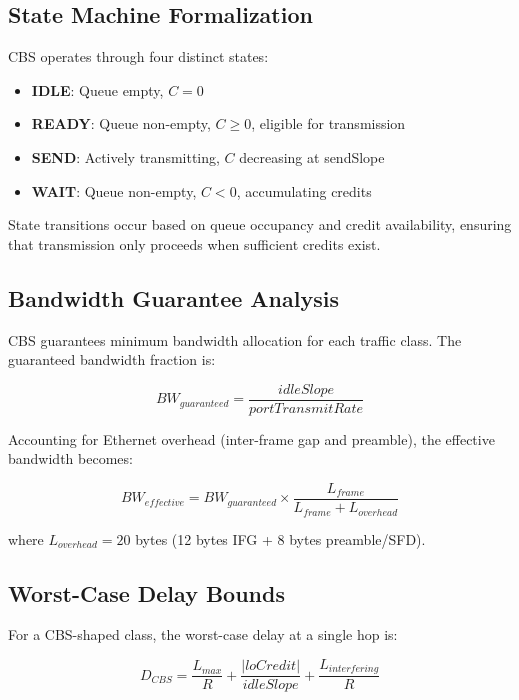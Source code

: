 \documentclass[10pt, journal, compsoc]{IEEEtran}
\begin{document}
\subsection{State Machine Formalization}

CBS operates through four distinct states:

\begin{itemize}
    \item \textbf{IDLE}: Queue empty, $C = 0$
    \item \textbf{READY}: Queue non-empty, $C \geq 0$, eligible for transmission
    \item \textbf{SEND}: Actively transmitting, $C$ decreasing at sendSlope
    \item \textbf{WAIT}: Queue non-empty, $C < 0$, accumulating credits
\end{itemize}

State transitions occur based on queue occupancy and credit availability, ensuring that transmission only proceeds when sufficient credits exist.

\subsection{Bandwidth Guarantee Analysis}

CBS guarantees minimum bandwidth allocation for each traffic class. The guaranteed bandwidth fraction is:

\begin{equation}
BW_{guaranteed} = \frac{idleSlope}{portTransmitRate}
\end{equation}

Accounting for Ethernet overhead (inter-frame gap and preamble), the effective bandwidth becomes:

\begin{equation}
BW_{effective} = BW_{guaranteed} \times \frac{L_{frame}}{L_{frame} + L_{overhead}}
\end{equation}

where $L_{overhead} = 20$ bytes (12 bytes IFG + 8 bytes preamble/SFD).

\subsection{Worst-Case Delay Bounds}

For a CBS-shaped class, the worst-case delay at a single hop is:

\begin{equation}
D_{CBS} = \frac{L_{max}}{R} + \frac{|loCredit|}{idleSlope} + \frac{L_{interfering}}{R}
\end{equation}
\end{document}
